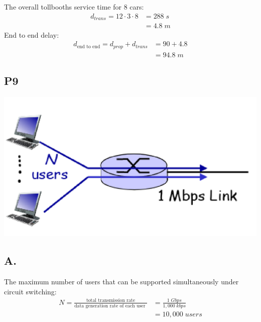 \documentclass[journal]{IEEEtran}
\begin{document}
\subsection{}
The overall tollbooths service time for 8 cars:
\begin{equation*}
  \begin{split}
  d_{trans} = 12 \cdot 3 \cdot 8 & = 288\;s \\
  & = 4.8\;m
  \end{split}
\end{equation*}
\hspace{0.3cm}End to end delay:
\begin{equation*}
  \begin{split}
  d_{\text{end to end}} = d_{prop} + d_{trans} & = 90 + 4.8 \\
  & = 94.8\;m
  \end{split}
\end{equation*}





\subsection*{P9}
\includegraphics[scale=0.5]{P9}
\subsection*{A.}
The maximum number of users that can be supported simultaneously under circuit switching:
\begin{equation*}
  \begin{split}
    N = \frac{\text{total transmission rate}}{\text{data generation rate of each user }} & = \frac{1 \; Gbps}{1,000 \; kbps} \\
    & = 10,000 \; users
  \end{split}
\end{equation*}
\end{document}

